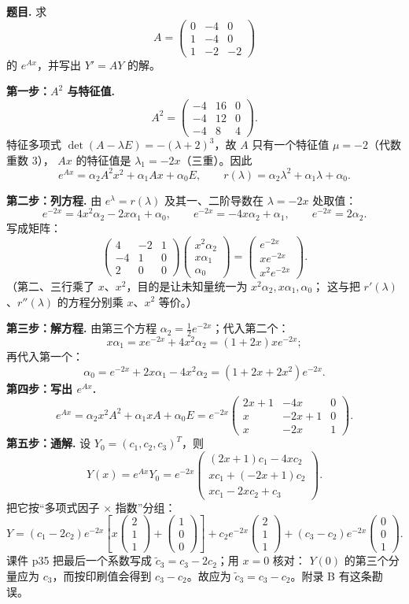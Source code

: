 \documentclass[11pt]{ctexart}
\newcommand{\pmat}[1]{\begin{pmatrix}#1\end{pmatrix}}
\newcommand{\Ax}{Ax}
\begin{document}

\textbf{题目.} 求
\[
A=\pmat{0&-4&0\\1&-4&0\\1&-2&-2}
\]
的 $e^{Ax}$，并写出 $Y'=AY$ 的解。

\textbf{第一步：$A^2$ 与特征值.}
\[
A^2=\pmat{-4&16&0\\-4&12&0\\-4&8&4}.
\]
特征多项式 $\det(A-\lambda E)=-(\lambda+2)^3$，故 $A$ 只有一个特征值 $\mu=-2$（代数重数 3），
$\Ax$ 的特征值是 $\lambda_1=-2x$（三重）。因此
\[
e^{Ax}=\alpha_2A^2x^2+\alpha_1\Ax+\alpha_0E,\qquad
r(\lambda)=\alpha_2\lambda^2+\alpha_1\lambda+\alpha_0 .
\]

\textbf{第二步：列方程.} 由 $e^{\lambda}=r(\lambda)$ 及其一、二阶导数在 $\lambda=-2x$ 处取值：
\[
e^{-2x}=4x^2\alpha_2-2x\alpha_1+\alpha_0,\qquad
e^{-2x}=-4x\alpha_2+\alpha_1,\qquad
e^{-2x}=2\alpha_2 .
\]
写成矩阵：
\[
\pmat{4&-2&1\\-4&1&0\\2&0&0}\pmat{x^2\alpha_2\\x\alpha_1\\\alpha_0}
=\pmat{e^{-2x}\\xe^{-2x}\\x^2e^{-2x}} .
\]
（第二、三行乘了 $x$、$x^2$，目的是让未知量统一为 $x^2\alpha_2,x\alpha_1,\alpha_0$；
这与把 $r'(\lambda)$、$r''(\lambda)$ 的方程分别乘 $x$、$x^2$ 等价。）

\textbf{第三步：解方程.}
由第三个方程 $\alpha_2=\frac12e^{-2x}$；代入第二个：
\[
x\alpha_1=xe^{-2x}+4x^2\alpha_2=(1+2x)xe^{-2x};
\]
再代入第一个：
\[
\alpha_0=e^{-2x}+2x\alpha_1-4x^2\alpha_2=(1+2x+2x^2)e^{-2x}.
\]
\textbf{第四步：写出 $e^{Ax}$.}
\[
e^{Ax}=\alpha_2x^2A^2+\alpha_1x A+\alpha_0E
=e^{-2x}\pmat{2x+1&-4x&0\\x&-2x+1&0\\x&-2x&1}.
\]
\textbf{第五步：通解.} 设 $Y_0=(c_1,c_2,c_3)^T$，则
\[
Y(x)=e^{Ax}Y_0
=e^{-2x}\pmat{(2x+1)c_1-4xc_2\\xc_1+(-2x+1)c_2\\xc_1-2xc_2+c_3}.
\]
把它按“多项式因子 $\times$ 指数”分组：
\[
Y=(c_1-2c_2)e^{-2x}\left[x\pmat{2\\1\\1}+\pmat{1\\0\\0}\right]
+c_2e^{-2x}\pmat{2\\1\\1}
+(c_3-c_2)e^{-2x}\pmat{0\\0\\1}.
\]
课件 p35 把最后一个系数写成 $\tilde c_3=c_3-2c_2$；用 $x=0$ 核对：
$Y(0)$ 的第三个分量应为 $c_3$，而按印刷值会得到 $c_3-c_2$。故应为
$\tilde c_3=c_3-c_2$。附录 B 有这条勘误。
\end{document}
